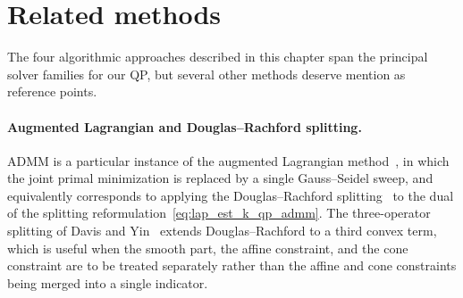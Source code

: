 


\section{Related methods}
\label{sec:related_methods}

The four algorithmic approaches described in this chapter span the principal solver families for our QP, but several other methods deserve mention as reference points.

\paragraph{Augmented Lagrangian and Douglas--Rachford splitting.} ADMM is a particular instance of the augmented Lagrangian method~\cite{bertsekas1982constrained}, in which the joint primal minimization is replaced by a single Gauss--Seidel sweep, and equivalently corresponds to applying the Douglas--Rachford splitting~\cite{douglas1956numerical} to the dual of the splitting reformulation~\eqref{eq:lap_est_k_qp_admm}. The three-operator splitting of Davis and Yin~\cite{davis2017three} extends Douglas--Rachford to a third convex term, which is useful when the smooth part, the affine constraint, and the cone constraint are to be treated separately rather than the affine and cone constraints being merged into a single indicator.

